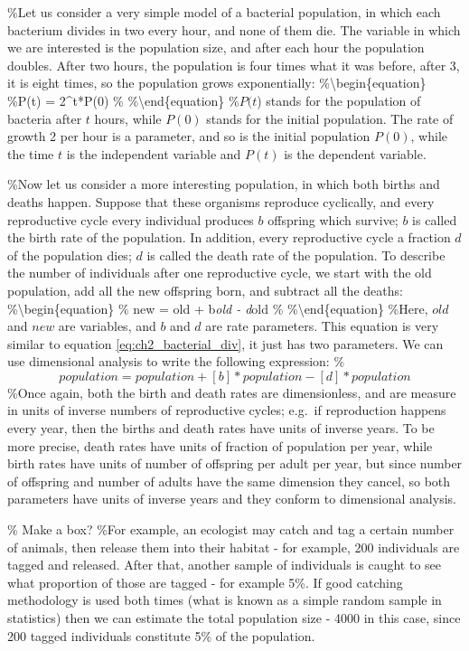 \documentclass[
]{book}
\begin{document}
\%Let us consider a very simple model of a bacterial population, in which each bacterium divides in two every hour, and none of them die. The variable in which we are interested is the population size, and after each hour the population doubles. After two hours, the population is four times what it was before, after 3, it is eight times, so the population grows exponentially:
\%\textbackslash begin\{equation\}
\%P(t) = 2\^{}t*P(0)
\%\label{eq:ch2_bacterial_div}
\%\textbackslash end\{equation\}
\%\(P(t\)) stands for the population of bacteria after \(t\) hours, while \(P(0)\) stands for the initial population. The rate of growth 2 per hour is a parameter, and so is the initial population \(P(0)\), while the time \(t\) is the independent variable and \(P(t)\) is the dependent variable.

\%Now let us consider a more interesting population, in which both births and deaths happen. Suppose that these organisms reproduce cyclically, and every reproductive cycle every individual produces \(b\) offspring which survive; \(b\) is called the birth rate of the population. In addition, every reproductive cycle a fraction \(d\) of the population dies; \(d\) is called the death rate of the population. To describe the number of individuals after one reproductive cycle, we start with the old population, add all the new offspring born, and subtract all the deaths:
\%\textbackslash begin\{equation\}
\% new = old + b\emph{old - d}old
\%\label{eq:ch2_gen_pop}
\%\textbackslash end\{equation\}
\%Here, \(old\) and \(new\) are variables, and \(b\) and \(d\) are rate parameters. This equation is very similar to equation \ref{eq:ch2_bacterial_div}, it just has two parameters. We can use dimensional analysis to write the following expression:
\%\[ population = population  +   [b]*population  -  [d]*population \]
\%Once again, both the birth and death rates are dimensionless, and are measure in units of inverse numbers of reproductive cycles; e.g.~if reproduction happens every year, then the births and death rates have units of inverse years. To be more precise, death rates have units of fraction of population per year, while birth rates have units of number of offspring per adult per year, but since number of offspring and number of adults have the same dimension they cancel, so both parameters have units of inverse years and they conform to dimensional analysis.

\% Make a box?
\%For example, an ecologist may catch and tag a certain number of animals, then release them into their habitat - for example, 200 individuals are tagged and released. After that, another sample of individuals is caught to see what proportion of those are tagged - for example 5\%. If good catching methodology is used both times (what is known as a simple random sample in statistics) then we can estimate the total population size - 4000 in this case, since 200 tagged individuals constitute 5\% of the population.
\end{document}
